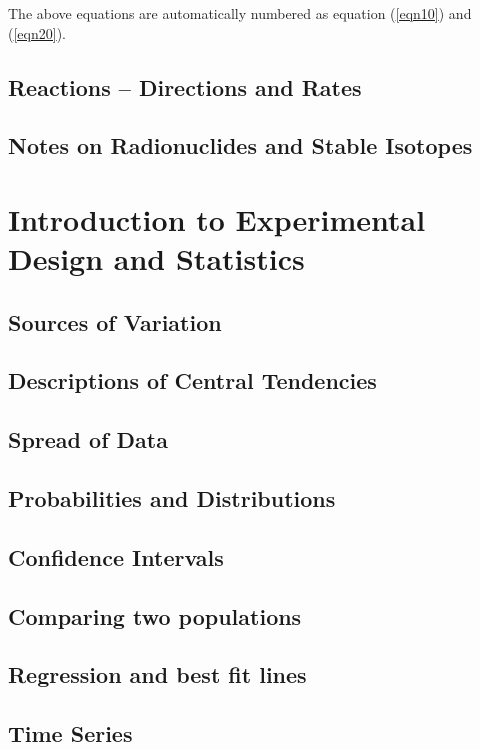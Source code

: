 \documentclass{tufte-book}\usepackage[]{graphicx}\usepackage[]{xcolor}
\begin{document}
The above equations are automatically numbered as equation
(\ref{eqn10}) and (\ref{eqn20}).

\section{Reactions -- Directions and Rates}

\section{Notes on Radionuclides and Stable Isotopes}


\chapter[Experiments and Statistics]{Introduction to Experimental Design and Statistics}

\section{Sources of Variation}

\section{Descriptions of Central Tendencies}

\section{Spread of Data}

\section{Probabilities and Distributions}

\section{Confidence Intervals}

\section{Comparing two populations}

\section{Regression and best fit lines}

\section{Time Series}
\end{document}
